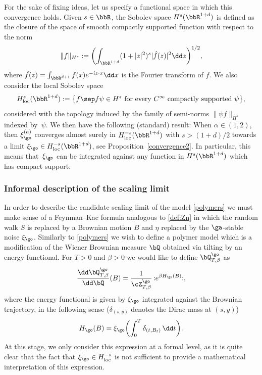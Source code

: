 For the sake of fixing ideas, let us specify a functional space in which this convergence holds.
Given $s\in \bbR$, the Sobolev space $H^s(\bbR^{1+d})$ is defined as the closure of the space of smooth compactly supported function with respect to the norm
\begin{equation}
\label{Hsnorm}
\|f\|_{H^s}:= \biggl(\int_{\bbR^{1+d}}(1+|z|^2)^{s} |\hat f(z)|^2 \dd z \biggr)^{1/2},
\end{equation}
where $\hat f(z)= \int_{\bbR^{d+1}} f(x) e^{-i z\cdot x} \dd x$ is the Fourier transform of $f$.
We also consider the local Sobolev space
\[
H^{s}_{\mathrm{loc}}(\bbR^{1+d}):= \bigl\{ f \sep f \psi \in H^{s} \text{ for every $C^{\infty}$ compactly supported $\psi$} \bigr\},
\]
considered with the topology induced by the family of semi-norms
$\| \psi f\|_{H^{s}}$ indexed by~$\psi$.
We then have the following (standard) result:
When $\alpha\in (1,2)$, then
$\xi_{\go}^{(a)}$ converges almost surely in $H^{-s}_{\mathrm{loc}}(\bbR^{1+d})$ with $s>(1+d)/2$ towards a limit $\xi_{\go} \in H^{-s}_{\mathrm{loc}}(\bbR^{1+d})$, see Proposition~\ref{convergence2}.
In particular, this means that~$\xi_{\go}$ can be integrated against any function in $H^s(\bbR^{1+d})$ which has compact support.

\subsubsection*{Informal description of the scaling limit}

In order to describe the candidate scaling limit of the model \eqref{polymers}
we must make sense of a Feynman--Kac formula analogous to \eqref{def:Zn}
in which the random walk $S$ is replaced by a Brownian motion $B$
and $\eta$ replaced by the $\ga$-stable noise $\xi_{\go}$.
Similarly to \eqref{polymers} we wish to define a polymer model which is a modification of the Wiener Brownian measure $\bQ$ obtained via tilting by an energy functional. For $T>0$ and $\beta>0$ we would like to define $\bQ^{\go}_{T,\beta}$ as
\begin{equation}\label{wewant}
\frac{\dd \bQ^{\go}_{T,\beta}}{\dd \bQ}(B)= \frac{1}{\cZ^{\go}_{T,\beta}} \, \mathbf{:}e^{\beta H_\go(B)}\mathbf{:},
\end{equation}
where the energy functional is given by $\xi_{\go}$ integrated against the Brownian trajectory,
in the following sense ($\delta_{(s,y)}$ denotes the Dirac mass at $(s,y)$)
\begin{equation}
H_{\go}(B)= \xi_{\go}\biggl(\int_{0}^T \delta_{(t,B_t)} \, \dd t\biggr).
\end{equation}
At this stage, we only consider this expression at a formal level, as it is quite clear that the fact that
$\xi_{\go}\in H_\mathrm{loc}^{-s}$ is not sufficient to provide a mathematical interpretation of this expression.

